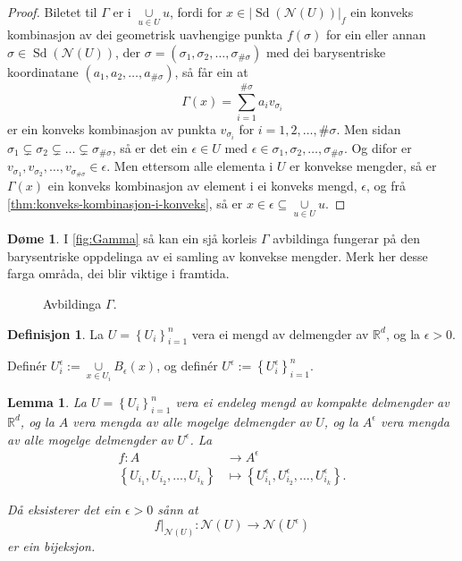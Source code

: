 \documentclass[a4paper, 12pt, norsk]{article}
\theoremstyle{plain}
\newtheorem{lemma}[theorem]{Lemma}
\theoremstyle{definition}
\newtheorem{definition}[theorem]{Definisjon}
\newtheorem{example}[theorem]{Døme}
\newcommand{\Rb}{\mathbb{R}}
\newcommand{\Nc}{\mathcal{N}}
\newcommand{\union}{ \mathop{\cup}\limits }
\newcommand{\gr}[1]{ \lvert #1 \rvert } %
\newcommand{\set}[1]{ \left\{ #1 \right\} } %
\newcommand{\tuple}[1]{ \left( #1 \right) } %
\DeclareMathOperator{\Sd}{Sd} %
\begin{document}
\begin{proof}
	Biletet til \( \Gamma \) er i \( \union_{u\in U} u \), fordi for \( x \in \gr{\Sd(\Nc(U))}_f \) ein konveks kombinasjon av dei geometrisk uavhengige punkta \( f(\sigma) \) for ein eller annan \( \sigma \in \Sd(\Nc(U)) \), der \( \sigma = \tuple{\sigma_1, \sigma_2, \dots, \sigma_{\#\sigma}} \) med dei barysentriske koordinatane \( \tuple{a_1, a_2, \dots, a_{\#\sigma}} \), så får ein at
	\[
		\Gamma(x) = \sum_{i=1}^{\#\sigma} a_i v_{\sigma_i}
	\]
	er ein konveks kombinasjon av punkta \( v_{\sigma_i} \) for \( i = 1,2,\dots,\#\sigma \). Men sidan \( \sigma_1 \subsetneq \sigma_2 \subsetneq \dots \subsetneq \sigma_{\#\sigma} \), så er det ein \( \epsilon \in U \) med \( \epsilon \in \sigma_1, \sigma_2, \dots, \sigma_{\#\sigma} \). Og difor er \( v_{\sigma_1}, v_{\sigma_2}, \dots, v_{\sigma_{\#\sigma}} \in \epsilon \). Men ettersom alle elementa i \( U \) er konvekse mengder, så er \( \Gamma(x) \) ein konveks kombinasjon av element i ei konveks mengd, \( \epsilon \), og frå \autoref{thm:konveks-kombinasjon-i-konveks}, så er \( x \in \epsilon \subseteq \union_{u\in U} u \).
\end{proof}

\begin{example}
	I \autoref{fig:Gamma} så kan ein sjå korleis \( \Gamma \) avbildinga fungerar på den barysentriske oppdelinga av ei samling av konvekse mengder. Merk her desse farga områda, dei blir viktige i framtida.
	\begin{figure}[htbp]
		\begin{center}
			
		\end{center}
		\caption{Avbildinga \( \Gamma \).}
		\label{fig:Gamma}
	\end{figure}
\end{example}

\begin{definition}
	La \(  U=\set{U_i}_{i=1}^n \) vera ei mengd av delmengder av \( \Rb^d \), og la \( \epsilon > 0 \).
	
	Definér \( U_i^\epsilon := \union_{x \in U_i} B_\epsilon(x) \), og definér \( U^\epsilon := \set{U_i^\epsilon}_{i=1}^n \).
\end{definition}

\begin{lemma} \label{thm:epsilondekke}
	La \( U = \set{U_i}_{i=1}^n \) vera ei endeleg mengd av kompakte delmengder av \( \Rb^d \), og la \( A \) vera mengda av alle mogelge delmengder av \( U \), og la \( A^\epsilon \) vera mengda av alle mogelge delmengder av \( U^\epsilon \). La
	\begin{align*}
		f: A &\to A^\epsilon \\
		\set{U_{i_1}, U_{i_2}, \dots, U_{i_k}} &\mapsto \set{U_{i_1}^\epsilon, U_{i_2}^\epsilon, \dots, U_{i_k}^\epsilon}.
	\end{align*}
	
	Då eksisterer det ein \( \epsilon > 0 \) sånn at
	\[
		f|_{\Nc(U)}: \Nc(U) \to \Nc(U^\epsilon)
	\]
	er ein bijeksjon.
\end{lemma}
\end{document}
